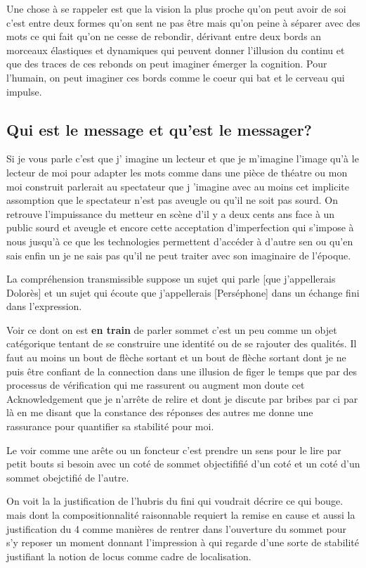 \documentclass{article}
\begin{document}
Une chose à se rappeler est que la vision la plus proche qu'on peut avoir de soi c'est entre deux formes qu'on sent ne pas être mais qu'on peine à séparer avec des mots ce qui fait qu'on ne cesse de rebondir, dérivant entre deux bords an morceaux élastiques et dynamiques qui peuvent donner l'illusion du continu et que des traces de ces rebonds on peut imaginer émerger la cognition. Pour l'humain, on peut imaginer ces bords  comme le coeur qui bat et le cerveau qui impulse.


\subsection{ Qui est le message et qu'est le messager?}

Si je vous parle c'est que j' imagine un lecteur et que je m'imagine l'image qu'à le lecteur de moi pour adapter les mots comme dans une pièce de théatre ou mon moi construit parlerait au spectateur que j 'imagine avec au moins cet implicite assomption que le spectateur n'est pas aveugle ou qu'il ne soit pas sourd.
On retrouve l'impuissance du metteur en scène d'il y a deux cents ans face à un public sourd et aveugle et encore cette acceptation d'imperfection qui s'impose à nous jusqu'à ce que les technologies permettent d'accéder à d'autre sen ou qu'en sais enfin un je ne sais pas qu'il  ne peut traiter avec son imaginaire de l'époque.

La compréhension transmissible suppose un sujet qui parle [que j'appellerais Dolorès] et un sujet qui écoute que j'appellerais [Perséphone] dans un échange fini dans l'expression.

Voir ce dont on  est  \textbf { en train} de parler sommet  c'est un peu comme un objet catégorique tentant de se construire une identité ou de se rajouter des qualités. Il faut au moins un bout de flèche sortant et un bout de flèche sortant dont je ne puis être confiant de la connection dans une illusion de figer le temps
que par des processus de vérification qui me rassurent ou augment mon doute cet Acknowledgement que je n'arrête de relire et dont je discute par bribes par ci par là en me disant que la constance des réponses des autres me donne une rassurance pour quantifier sa stabilité pour moi.

Le voir comme une arête ou un foncteur  c'est prendre un sens pour le lire par petit bouts si besoin avec un coté de sommet objectififié  d'un coté et un
coté d'un sommet obejctifié de l'autre.   

On voit la la justification de l'hubris du fini  qui voudrait  décrire ce qui bouge. mais dont la compositionnalité raisonnable requiert la remise en cause et aussi la justification du 4 comme manières de rentrer dans l'ouverture du sommet pour s'y reposer un moment donnant l'impression à qui regarde d'une sorte de stabilité justifiant la notion de locus comme cadre de localisation.
\end{document}
